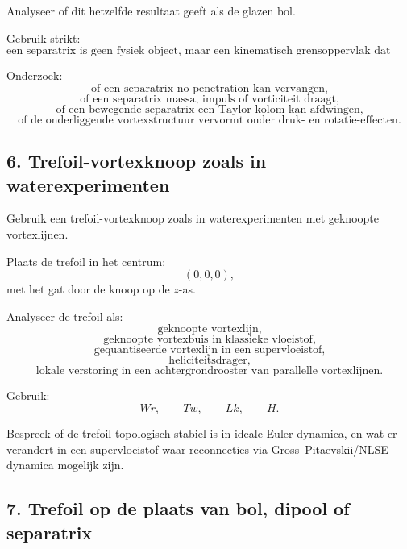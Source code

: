 \documentclass[11pt]{article}
\begin{document}
        Analyseer of dit hetzelfde resultaat geeft als de glazen bol.
        
        Gebruik strikt:
        \[
            \text{een separatrix is geen fysiek object, maar een kinematisch grensoppervlak dat volgt uit de stroming.}
        \]
        
        Onderzoek:
        \[
            \text{of een separatrix no-penetration kan vervangen,}
        \]
        \[
            \text{of een separatrix massa, impuls of vorticiteit draagt,}
        \]
        \[
            \text{of een bewegende separatrix een Taylor-kolom kan afdwingen,}
        \]
        \[
            \text{of de onderliggende vortexstructuur vervormt onder druk- en rotatie-effecten.}
        \]
    
    \subsection{6. Trefoil-vortexknoop zoals in waterexperimenten}
        
        Gebruik een trefoil-vortexknoop zoals in waterexperimenten met geknoopte vortexlijnen.
        
        Plaats de trefoil in het centrum:
        \[
            (0,0,0),
        \]
        met het gat door de knoop op de \(z\)-as.
        
        Analyseer de trefoil als:
        \[
            \text{geknoopte vortexlijn,}
        \]
        \[
            \text{geknoopte vortexbuis in klassieke vloeistof,}
        \]
        \[
            \text{gequantiseerde vortexlijn in een supervloeistof,}
        \]
        \[
            \text{heliciteitsdrager,}
        \]
        \[
            \text{lokale verstoring in een achtergrondrooster van parallelle vortexlijnen.}
        \]
        
        Gebruik:
        \[
            Wr,
            \qquad
            Tw,
            \qquad
            Lk,
            \qquad
            H.
        \]
        
        Bespreek of de trefoil topologisch stabiel is in ideale Euler-dynamica, en wat er verandert in een supervloeistof waar reconnecties via Gross--Pitaevskii/NLSE-dynamica mogelijk zijn.
    
    \subsection{7. Trefoil op de plaats van bol, dipool of separatrix}
        
\end{document}
